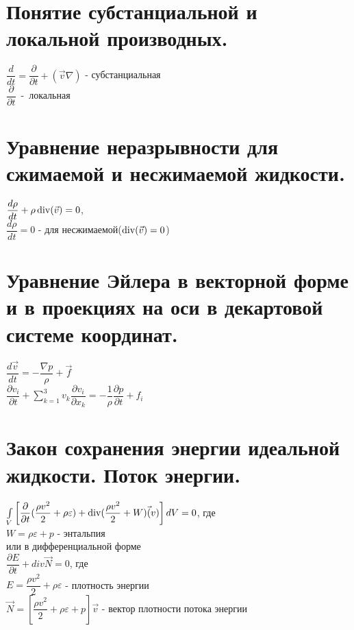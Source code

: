 


\newcommand{\sumk}{\sum\limits_{k=1}^3v_k}


	\small
	\begin{multicols*}{3}
		\section{Понятие субстанциальной и локальной производных.}
		$\dfrac{d}{dt}=\dfrac{\partial}{\partial t}+(\vec{v}\nabla)$ - субстанциальная \\
		$\dfrac{\partial}{\partial t}$~-~локальная
		
		\section{Уравнение неразрывности для сжимаемой и несжимаемой жидкости.}
		$\dfrac{d\rho}{dt}+\rho \operatorname{div}(\vec{v})=0$, \\
		$\dfrac{d\rho}{dt}=0$ -  для несжимаемой($\operatorname{div}(\vec{v})=0$)
		
		\section{Уравнение Эйлера в векторной форме и в проекциях на оси в декартовой системе координат.}
		$\dfrac{d\vec{v}}{dt}=-\dfrac{\nabla p}{\rho}+\vec{f}$ \\
		$\dfrac{\partial v_i}{\partial t}+\sumk\dfrac{\partial v_i}{\partial x_k}=-\dfrac{1}{\rho}\dfrac{\partial p}{\partial t}+f_i$
		
		\section{Закон сохранения энергии идеальной жидкости. Поток энергии.}
		$\int\limits_V\left[\dfrac{\partial}{\partial t}(\dfrac{\rho v^2}{2}+\rho\varepsilon)+\operatorname{div}(\dfrac{\rho v^2}{2}+W)\vec(v)\right]dV=0$, где\\
		$W=\rho\varepsilon+p$ - энтальпия \\
		или в дифференциальной форме \\
		$\dfrac{\partial E}{\partial t}+div\vec{N}=0$, где \\
		$E=\dfrac{\rho v^2}{2}+\rho\varepsilon$ - плотность энергии \\
		$\vec{N}=\left[\dfrac{\rho v^2}{2}+\rho\varepsilon+p\right]\vec{v}$ - вектор плотности потока энергии
		

\end{multicols*}
